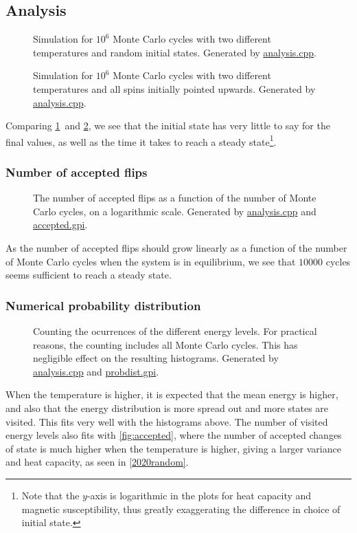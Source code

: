 \documentclass[12pt,english,a4paper]{article}
\newcommand{\program}[1]{\href{https://github.com/anjohan/Offentlig/blob/master/FYS3150/Oblig4/#1}{#1}}
\begin{document}
\subsection{Analysis}
\begin{figure}[H]
\centering
\caption{Simulation for \(10^6\) Monte Carlo cycles with two different temperatures and random initial states. Generated by \program{analysis.cpp}.}\label{2020random}
\end{figure}
\begin{figure}[H]
\centering
\caption{Simulation for \(10^6\) Monte Carlo cycles with two different temperatures and all spins initially pointed upwards. Generated by \program{analysis.cpp}.}\label{2020ordered}
\end{figure}
Comparing \ref{2020random} and \ref{2020ordered}, we see that the initial state has very little to say for the final values, as well as the time it takes to reach a steady state\footnote{Note that the \(y\)-axis is logarithmic in the plots for heat capacity and magnetic susceptibility, thus greatly exaggerating the difference in choice of initial state.}.

\subsubsection{Number of accepted flips}
\begin{figure}[H]
\centering

\caption{The number of accepted flips as a function of the number of Monte Carlo cycles, on a logarithmic scale. Generated by \program{analysis.cpp} and \program{accepted.gpi}.}\label{fig:accepted}
\end{figure}
As the number of accepted flips should grow linearly as a function of the number of Monte Carlo cycles when the system is in equilibrium, we see that \(\num{10000}\) cycles seems sufficient to reach a steady state.

\subsubsection{Numerical probability distribution}
\begin{figure}[H]
\centering

\caption{Counting the ocurrences of the different energy levels. For practical reasons, the counting includes all Monte Carlo cycles. This has negligible effect on the resulting histograms. Generated by \program{analysis.cpp} and \program{probdist.gpi}.}
\end{figure}
When the temperature is higher, it is expected that the mean energy is higher, and also that the energy distribution is more spread out and more states are visited. This fits very well with the histograms above. The number of visited energy levels also fits with \vref{fig:accepted}, where the number of accepted changes of state is much higher when the temperature is higher, giving a larger variance and heat capacity, as seen in \vref{2020random}.
\end{document}

